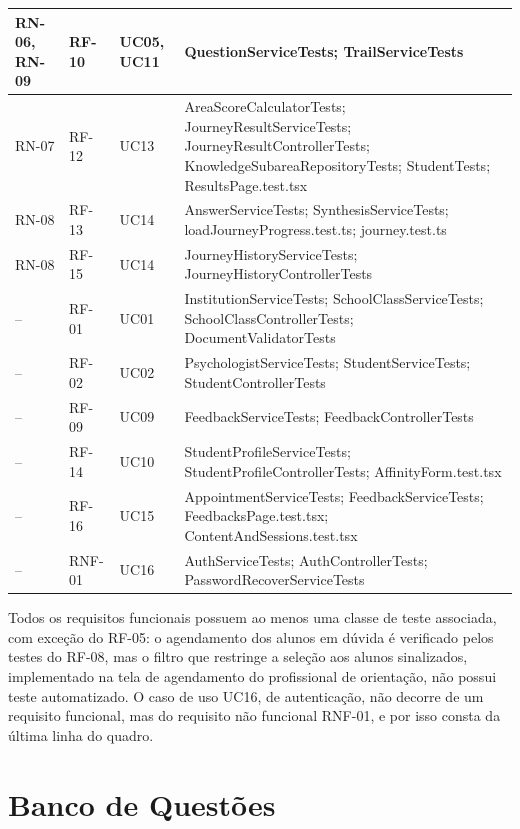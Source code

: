 \begin{apendicesenv}
{\begin{xltabular}{\textwidth}{|>{\centering\arraybackslash}p{1.9cm}|>{\centering\arraybackslash}p{1.5cm}|>{\centering\arraybackslash}p{2.0cm}|>{\raggedright\arraybackslash}X|}
\hline
RN-06, RN-09 & RF-10 & UC05, UC11 & QuestionServiceTests; \allowbreak TrailServiceTests \\
\hline
RN-07 & RF-12 & UC13 & AreaScoreCalculatorTests; \allowbreak JourneyResultServiceTests; \allowbreak JourneyResultControllerTests; \allowbreak KnowledgeSubareaRepositoryTests; \allowbreak StudentTests; \allowbreak ResultsPage.test.tsx \\
\hline
RN-08 & RF-13 & UC14 & AnswerServiceTests; \allowbreak SynthesisServiceTests; \allowbreak loadJourneyProgress.test.ts; \allowbreak journey.test.ts \\
\hline
RN-08 & RF-15 & UC14 & JourneyHistoryServiceTests; \allowbreak JourneyHistoryControllerTests \\
\hline
-- & RF-01 & UC01 & InstitutionServiceTests; \allowbreak SchoolClassServiceTests; \allowbreak SchoolClassControllerTests; \allowbreak DocumentValidatorTests \\
\hline
-- & RF-02 & UC02 & PsychologistServiceTests; \allowbreak StudentServiceTests; \allowbreak StudentControllerTests \\
\hline
-- & RF-09 & UC09 & FeedbackServiceTests; \allowbreak FeedbackControllerTests \\
\hline
-- & RF-14 & UC10 & StudentProfileServiceTests; \allowbreak StudentProfileControllerTests; \allowbreak AffinityForm.test.tsx \\
\hline
-- & RF-16 & UC15 & AppointmentServiceTests; \allowbreak FeedbackServiceTests; \allowbreak FeedbacksPage.test.tsx; \allowbreak ContentAndSessions.test.tsx \\
\hline
-- & RNF-01 & UC16 & AuthServiceTests; \allowbreak AuthControllerTests; \allowbreak PasswordRecoverServiceTests \\
\hline
\end{xltabular}
}

Todos os requisitos funcionais possuem ao menos uma classe de teste associada, com exceção do RF-05: o agendamento dos alunos em dúvida é verificado pelos testes do RF-08, mas o filtro que restringe a seleção aos alunos sinalizados, implementado na tela de agendamento do profissional de orientação, não possui teste automatizado. O caso de uso UC16, de autenticação, não decorre de um requisito funcional, mas do requisito não funcional RNF-01, e por isso consta da última linha do quadro.

\chapter{Banco de Questões}\label{apendice-banco-questoes}


\end{apendicesenv}

